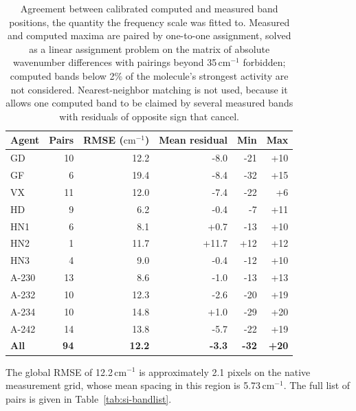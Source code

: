 \documentclass[11pt]{article}
\newcommand*\wn{\ensuremath{\text{cm}^{-1}}}
\begin{document}
\begin{table}[htbp]
\centering
\caption{Agreement between calibrated computed and measured band positions, the quantity the frequency scale was fitted to. Measured and computed maxima are paired by one-to-one assignment, solved as a linear assignment problem on the matrix of absolute wavenumber differences with pairings beyond 35\,\wn{} forbidden; computed bands below 2\% of the molecule's strongest activity are not considered. Nearest-neighbor matching is not used, because it allows one computed band to be claimed by several measured bands with residuals of opposite sign that cancel.}
\label{tab:si-bands}
\small
\begin{tabular}{lrrrrr}
\toprule
Agent & Pairs & RMSE (\wn) & Mean residual & Min & Max \\
\midrule
GD & 10 & 12.2 & -8.0 & -21 & +10 \\
GF & 6 & 19.4 & -8.4 & -32 & +15 \\
VX & 11 & 12.0 & -7.4 & -22 & +6 \\
HD & 9 & 6.2 & -0.4 & -7 & +11 \\
HN1 & 6 & 8.1 & +0.7 & -13 & +10 \\
HN2 & 1 & 11.7 & +11.7 & +12 & +12 \\
HN3 & 4 & 9.0 & -0.4 & -12 & +10 \\
A-230 & 13 & 8.6 & -1.0 & -13 & +13 \\
A-232 & 10 & 12.3 & -2.6 & -20 & +19 \\
A-234 & 10 & 14.8 & +1.0 & -29 & +20 \\
A-242 & 14 & 13.8 & -5.7 & -22 & +19 \\
\textbf{All} & \textbf{94} & \textbf{12.2} & \textbf{-3.3} & \textbf{-32} & \textbf{+20} \\
\bottomrule
\end{tabular}

\begin{flushleft}\footnotesize The global RMSE of 12.2\,\wn{} is approximately 2.1 pixels on the native measurement grid, whose mean spacing in this region is 5.73\,\wn{}. The full list of pairs is given in Table~\ref{tab:si-bandlist}.\end{flushleft}
\end{table}
\clearpage
\end{document}
